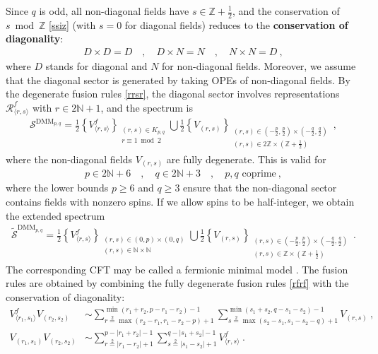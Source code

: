 \documentclass[12pt, a4paper]{article}
\theoremstyle{break}
\begin{document}
Since $q$ is odd, all non-diagonal fields have $s\in \mathbb{Z}+\frac12$, and the conservation of $s\bmod \mathbb{Z}$ \eqref{ssiz} (with $s=0$ for diagonal fields) reduces to the \textbf{conservation of diagonality}:
\begin{align}
D\times D = D \quad , \quad D\times N = N \quad , \quad N\times N = D \ ,
\label{ddd}
\end{align}
where $D$ stands for diagonal and $N$ for non-diagonal fields. 
Moreover, we assume that the diagonal sector is generated by taking OPEs of non-diagonal fields. 
By the degenerate fusion rules \eqref{rrsr}, the diagonal sector involves representations $\mathcal{R}^f_{\langle r,s\rangle}$ with $r\in 2\mathbb{N}+1$, and the spectrum is 
\begin{align}
 \boxed{\mathcal{S}^{\text{DMM}_{p,q}} = \frac12\left\{ V^f_{\langle r,s\rangle} \right\}_{\substack{(r,s)\in K_{p, q}\\ r\equiv 1\bmod 2}} 
 \bigcup 
 \frac12\left\{V_{(r,s)} \right\}_{\substack{(r,s)\in (-\frac{p}{2},\frac{p}{2})\times (-\frac{q}{2},\frac{q}{2})\\ (r,s)\in 2\mathbb{Z}\times (\mathbb{Z}+\frac12)}}
}\ ,
\label{sdmm}
\end{align}
where the non-diagonal fields $V_{(r,s)}$ are fully degenerate. This is valid for 
\begin{align}
 \boxed{p\in 2\mathbb{N}+6 \quad , \quad q \in 2\mathbb{N}+3 \quad ,\quad p,q\text{ coprime}} \ ,
\end{align}
where the lower bounds $p\geq 6$ and $q\geq 3$ ensure that the non-diagonal sector contains fields with nonzero spins. If we allow spins to be half-integer, we obtain the extended spectrum
\begin{align}
 \widetilde{\mathcal{S}}^{\text{DMM}_{p,q}} = \frac12\left\{ V^f_{\langle r,s\rangle} \right\}_{\substack{(r,s)\in (0,p) \times (0,q)\\ (r,s)\in \mathbb{N}\times \mathbb{N}}} 
 \bigcup 
 \frac12\left\{V_{(r,s)} \right\}_{\substack{(r,s)\in (-\frac{p}{2},\frac{p}{2})\times (-\frac{q}{2},\frac{q}{2})\\ (r,s)\in \mathbb{Z}\times (\mathbb{Z}+\frac12)}}
\ .
\end{align}
The corresponding CFT may be called a fermionic minimal model \cite{rw20}. The fusion rules are obtained by combining the fully degenerate fusion rules \eqref{rfrf} with the conservation of diagonality:
\begin{align}
 V^f_{\langle r_1,s_1\rangle}V_{(r_2,s_2)} &\sim \sum_{r\overset{2}{=}\max(r_2-r_1,r_1-r_2-p)+1}^{\min(r_1+r_2,p-r_1-r_2)-1} \sum_{s\overset{2}{=}\max(s_2-s_1,s_1-s_2-q)+1}^{\min(s_1+s_2,q-s_1-s_2)-1} V_{(r,s)} \ ,
 \label{vfvn}
 \\
 V_{(r_1,s_1)} V_{(r_2,s_2)} & \sim \sum_{r\overset{2}{=}|r_1-r_2|+1}^{p-|r_1+r_2|-1} \sum_{s\overset{2}{=}|s_1-s_2|+1}^{q-|s_1+s_2|-1} V^f_{\langle r,s\rangle}\ . 
 \label{vnvn}
\end{align}
\end{document}
